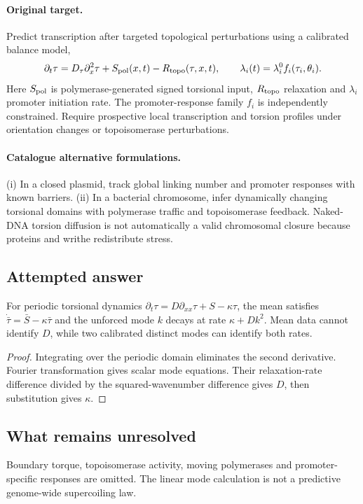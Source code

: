 \documentclass[11pt]{article}
\begin{document}
\paragraph{Original target.}
Predict transcription after targeted topological perturbations using a calibrated balance model,
\[\partial_t\tau=D_\tau\partial_x^2\tau+S_{\rm pol}(x,t)-R_{\rm topo}(\tau,x,t),\qquad \lambda_i(t)=\lambda_i^0 f_i(\tau_i,\theta_i).\]
Here $S_{\rm pol}$ is polymerase-generated signed torsional input, $R_{\rm topo}$ relaxation and $\lambda_i$ promoter initiation rate. The promoter-response family $f_i$ is independently constrained. Require prospective local transcription and torsion profiles under orientation changes or topoisomerase perturbations.
\paragraph{Catalogue alternative formulations.}
(i) In a closed plasmid, track global linking number and promoter responses with known barriers. (ii) In a bacterial chromosome, infer dynamically changing torsional domains with polymerase traffic and topoisomerase feedback. Naked-DNA torsion diffusion is not automatically a valid chromosomal closure because proteins and writhe redistribute stress.
\subsection{Attempted answer}
\begin{proposition}
For periodic torsional dynamics $\partial_t\tau=D\partial_{xx}\tau+S-\kappa\tau$, the mean satisfies $\dot{\bar\tau}=\bar S-\kappa\bar\tau$ and the unforced mode $k$ decays at rate $\kappa+Dk^2$. Mean data cannot identify $D$, while two calibrated distinct modes can identify both rates.
\end{proposition}
\begin{proof}
Integrating over the periodic domain eliminates the second derivative. Fourier transformation gives scalar mode equations. Their relaxation-rate difference divided by the squared-wavenumber difference gives $D$, then substitution gives $\kappa$.
\end{proof}
\subsection{What remains unresolved}
Boundary torque, topoisomerase activity, moving polymerases and promoter-specific responses are omitted. The linear mode calculation is not a predictive genome-wide supercoiling law.
\end{document}
